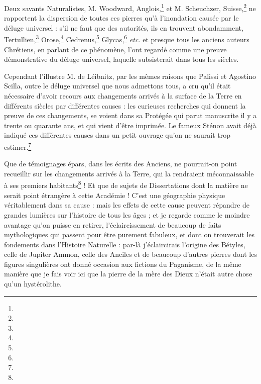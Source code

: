 \documentclass[a4paper, 11pt, oneside, polutonikogreek, french]{article}
\begin{document}
Deux savants Naturalistes, M. Woodward, Anglois,\footnote{} et M. Scheuchzer, Suisse,\footnote{} ne rapportent la dispersion de toutes ces pierres qu'à l'inondation causée par le déluge universel : s'il ne faut que des autorités, ils en trouvent abondamment, Tertullien,\footnote{} Orose,\footnote{} Cedrenus,\footnote{} Glycas,\footnote{} \emph{etc.} et presque tous les anciens auteurs Chrétiens, en parlant de ce phénomène, l'ont regardé comme une preuve démonstrative du déluge universel, laquelle subsisterait dans tous les siècles.

Cependant l'illustre M. de Léibnitz, par les mêmes raisons que Palissi et Agostino Scilla, outre le déluge universel que nous admettons tous, a cru qu'il était nécessaire d'avoir recours aux changements arrivés à la surface de la Terre en différents siècles par différentes causes : les curieuses recherches qui donnent la preuve de ces changements, se voient dans sa Protégée qui parut manuscrite il y a trente ou quarante ans, et qui vient d'être imprimée. Le fameux Sténon avait déjà indiqué ces différentes causes dans un petit ouvrage qu'on ne saurait trop estimer.\footnote{}

Que de témoignages épars, dans les écrits des Anciens, ne pourrait-on point recueillir sur les changements arrivés à la Terre, qui la rendraient méconnaissable à ses premiers habitants\footnote{} ! Et que de sujets de Dissertations dont la matière ne serait point étrangère à cette Académie ! C'est une géographie physique véritablement dans sa cause : mais les effets de cette cause peuvent répandre de grandes lumières sur l'histoire de tous les âges ; et je regarde comme le moindre avantage qu'on puisse en retirer, l'éclaircissement de beaucoup de faits mythologiques qui passent pour être purement fabuleux, et dont on trouverait les fondements dans l'Histoire Naturelle : par-là j'éclaircirais l'origine des Bétyles, celle de Jupiter Ammon, celle des Anciles et de beaucoup d'autres pierres dont les figures singulières ont donné occasion aux fictions du Paganisme, de la même manière que je fais voir ici que la pierre de la mère des Dieux n'était autre chose qu'un hystérolithe.
\end{document}
